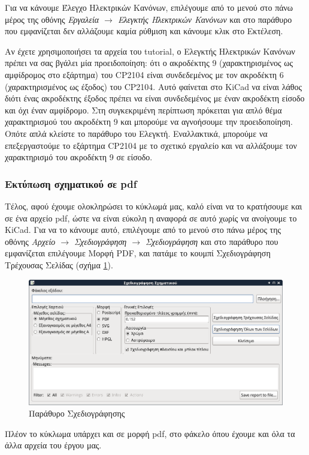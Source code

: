 \documentclass[a4paper]{article}
\begin{document}
Για να κάνουμε Έλεγχο Ηλεκτρικών Κανόνων, επιλέγουμε από το μενού στο πάνω μέρος της οθόνης \textit{Εργαλεία $\rightarrow$ Ελεγκτής Ηλεκτρικών Κανόνων} και στο παράθυρο που εμφανίζεται δεν αλλάζουμε καμία ρύθμιση και κάνουμε κλικ στο Εκτέλεση. 

Αν έχετε χρησιμοποιήσει τα αρχεία του tutorial, ο Ελεγκτής Ηλεκτρικών Κανόνων πρέπει να σας βγάλει μία προειδοποίηση: ότι ο ακροδέκτης 9 (χαρακτηρισμένος ως αμφίδρομος στο εξάρτημα) του CP2104 είναι συνδεδεμένος με τον ακροδέκτη 6 (χαρακτηρισμένος ως έξοδος) του CP2104. Αυτό φαίνεται στο \textenglish{KiCad} να είναι λάθος διότι ένας ακροδέκτης έξοδος πρέπει να είναι συνδεδεμένος με έναν ακροδέκτη είσοδο και όχι έναν αμφίδρομο. Στη συγκεκριμένη περίπτωση πρόκειται για απλό θέμα χαρακτηρισμού του ακροδέκτη 9 και μπορούμε να αγνοήσουμε την προειδοποίηση. Οπότε απλά κλείστε το παράθυρο του Ελεγκτή.
Εναλλακτικά, μπορούμε να επεξεργαστούμε το εξάρτημα CP2104 με το σχετικό εργαλείο και να αλλάξουμε τον χαρακτηρισμό του ακροδέκτη 9 σε είσοδο.

\subsubsection{Εκτύπωση σχηματικού σε pdf}
Τέλος, αφού έχουμε ολοκληρώσει το κύκλωμά μας, καλό είναι να το κρατήσουμε και σε ένα αρχείο pdf, ώστε να είναι εύκολη η αναφορά σε αυτό χωρίς να ανοίγουμε το \textenglish{KiCad}. Για να το κάνουμε αυτό, επιλέγουμε από το μενού στο πάνω μέρος της οθόνης \textit{Αρχείο $\rightarrow$ Σχεδιογράφηση $\rightarrow$ Σχεδιογράφηση} και στο παράθυρο που εμφανίζεται επιλέγουμε Μορφή PDF, και πατάμε το κουμπί Σχεδιογράφηση Τρέχουσας Σελίδας (σχήμα \ref{fig:eesch-dial-plot}). 

\begin{figure}
  \begin{center}
    \includegraphics[width=.5\textwidth]{img/eesch-dial-plot.png}
    \caption{Παράθυρο Σχεδιογράφησης}
    \label{fig:eesch-dial-plot}
  \end{center}
\end{figure}

Πλέον το κύκλωμα υπάρχει και σε μορφή pdf, στο φάκελο όπου έχουμε και όλα τα άλλα αρχεία του έργου μας. 
\end{document}
